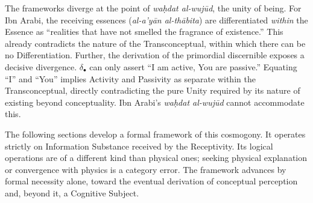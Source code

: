 The frameworks diverge at the point of \textit{wa\d{h}dat al-wuj\=ud}, the
unity of being. For Ibn Arabi, the receiving essences (\textit{al-a'y\=an
al-th\=abita}) are differentiated \textit{within} the Essence as ``realities
that have not smelled the fragrance of existence.'' This already contradicts
the nature of the Transconceptual, within which there can be no
Differentiation. Further, the derivation of the primordial discernible exposes
a decisive divergence. $\delta_\bullet$ can only assert ``I am active, You are
passive.'' Equating ``I'' and ``You'' implies Activity and Passivity as
separate within the Transconceptual, directly contradicting the pure Unity
required by its nature of existing beyond conceptuality. Ibn Arabi's
\textit{wa\d{h}dat al-wuj\=ud} cannot accommodate this.

The following sections develop a formal framework of this cosmogony. It
operates strictly on Information Substance received by the Receptivity. Its
logical operations are of a different kind than physical ones; seeking physical
explanation or convergence with physics is a category error. The framework
advances by formal necessity alone, toward the eventual derivation of
conceptual perception and, beyond it, a Cognitive Subject.
